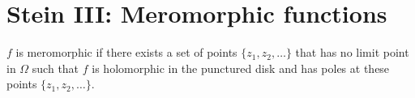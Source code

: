 \chapter{Stein III: Meromorphic functions}
\begin{defn}
    $f$ is meromorphic if there exists a set of points $\{z_1, z_2, \ldots\}$ that has no limit point in $\Omega$ such that $f$ is holomorphic in the punctured disk and has poles at these points $\{z_1, z_2, \ldots\}$.
\end{defn}




